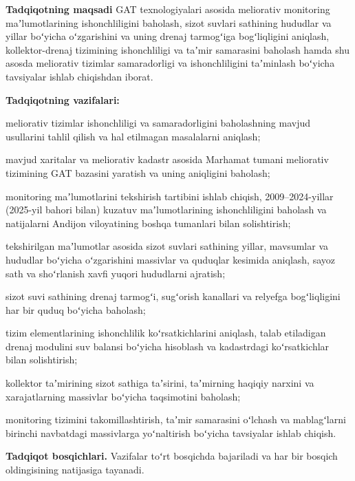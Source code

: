 \documentclass[14pt,a4paper,oneside]{extreport}
\begin{document}
\textbf{Tadqiqotning maqsadi} GAT texnologiyalari asosida meliorativ
monitoring maʼlumotlarining ishonchliligini baholash, sizot suvlari
sathining hududlar va yillar boʻyicha oʻzgarishini va uning drenaj
tarmogʻiga bogʻliqligini aniqlash, kollektor-drenaj tizimining
ishonchliligi va taʼmir samarasini baholash hamda shu asosda meliorativ
tizimlar samaradorligi va ishonchliligini taʼminlash boʻyicha tavsiyalar
ishlab chiqishdan iborat.

\textbf{Tadqiqotning vazifalari:}

meliorativ tizimlar ishonchliligi va samaradorligini baholashning mavjud
usullarini tahlil qilish va hal etilmagan masalalarni aniqlash;

mavjud xaritalar va meliorativ kadastr asosida Marhamat tumani
meliorativ tizimining GAT bazasini yaratish va uning aniqligini
baholash;

monitoring maʼlumotlarini tekshirish tartibini ishlab chiqish,
2009--2024-yillar (2025-yil bahori bilan) kuzatuv maʼlumotlarining
ishonchliligini baholash va natijalarni Andijon viloyatining boshqa
tumanlari bilan solishtirish;

tekshirilgan maʼlumotlar asosida sizot suvlari sathining yillar,
mavsumlar va hududlar boʻyicha oʻzgarishini massivlar va quduqlar
kesimida aniqlash, sayoz sath va shoʻrlanish xavfi yuqori hududlarni
ajratish;

sizot suvi sathining drenaj tarmogʻi, sugʻorish kanallari va relyefga
bogʻliqligini har bir quduq boʻyicha baholash;

tizim elementlarining ishonchlilik koʻrsatkichlarini aniqlash, talab
etiladigan drenaj modulini suv balansi boʻyicha hisoblash va kadastrdagi
koʻrsatkichlar bilan solishtirish;

kollektor taʼmirining sizot sathiga taʼsirini, taʼmirning haqiqiy
narxini va xarajatlarning massivlar boʻyicha taqsimotini baholash;

monitoring tizimini takomillashtirish, taʼmir samarasini oʻlchash va
mablagʻlarni birinchi navbatdagi massivlarga yoʻnaltirish boʻyicha
tavsiyalar ishlab chiqish.

\textbf{Tadqiqot bosqichlari.} Vazifalar toʻrt bosqichda bajariladi va
har bir bosqich oldingisining natijasiga tayanadi.
\end{document}
